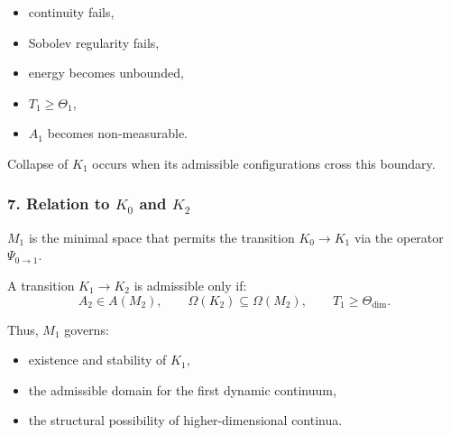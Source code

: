 \begin{itemize}
    \item continuity fails,
    \item Sobolev regularity fails,
    \item energy becomes unbounded,
    \item $T_1 \ge \Theta_1$,
    \item $A_1$ becomes non-measurable.
\end{itemize}

Collapse of $K_1$ occurs when its admissible configurations cross this boundary.

\subsubsection*{7. Relation to \texorpdfstring{$K_0$}{K_0} and \texorpdfstring{$K_2$}{K_2}}

$M_1$ is the minimal space that permits the transition $K_0 \to K_1$ via the operator $\Psi_{0\to1}$.

A transition $K_1 \to K_2$ is admissible only if:
\[
A_2 \in A(M_2),\qquad
\Omega(K_2) \subseteq \Omega(M_2),\qquad
T_1 \ge \Theta_{\text{dim}}.
\]

Thus, $M_1$ governs:

\begin{itemize}
    \item existence and stability of $K_1$,
    \item the admissible domain for the first dynamic continuum,
    \item the structural possibility of higher-dimensional continua.
\end{itemize}
